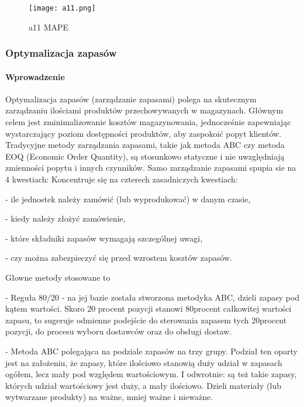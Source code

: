 \begin{figure}[h!]
    \label{fig:a11}
    \centering \texttt{[image: a11.png]}
    \caption{a11 MAPE \cite{Shekh2018}}
\end{figure}

\cite{carb2006}\cite{Mary2022}\cite{wikknn2023}\cite{Shekh2018}\cite{Xiao2021}\cite{Resul2017}


\newpage
\subsubsection{Optymalizacja zapasów}

\paragraph{Wprowadzenie}

Optymalizacja zapasów (zarządzanie zapasami) polega na skutecznym zarządzaniu ilościami produktów przechowywanych w magazynach. Głównym celem jest zminimalizowanie kosztów magazynowania, jednocześnie zapewniając wystarczający poziom dostępności produktów, aby zaspokoić popyt klientów. Tradycyjne metody zarządzania zapasami, takie jak metoda ABC czy metoda EOQ (Economic Order Quantity), są stosunkowo statyczne i nie uwzględniają zmienności popytu i innych czynników.
Samo zarządzanie zapasami spupia sie na 4 kwestiach:
Koncentruje się na czterech zasadniczych kwestiach:

   - ile jednostek należy zamówić (lub wyprodukować) w danym czasie,
   
   - kiedy należy złożyć zamówienie,
   
  -  które składniki zapasów wymagają szczególnej uwagi,
  
 -   czy można zabezpieczyć się przed wzrostem kosztów zapasów.

  Głowne metody stosowane to
  
 - Reguła 80/20 - na jej bazie została stworzona metodyka ABC, dzieli zapasy pod kątem wartości. Skoro 20 procent pozycji stanowi 80procent całkowitej wartości zapasu, to sugeruje odmienne podejście do sterowania zapasem tych 20procent pozycji, do procesu wyboru dostawców oraz do obsługi dostaw.

 - Metoda ABC polegająca na podziale zapasów na trzy grupy. Podział ten oparty jest na założeniu, że zapasy, które ilościowo stanowią duży udział w zapasach ogółem, lecz mały pod względem wartościowym. I odwrotnie: są też takie zapasy, których udział wartościowy jest duży, a mały ilościowo. Dzieli materiały (lub wytwarzane produkty) na ważne, mniej ważne i nieważne. 
 
